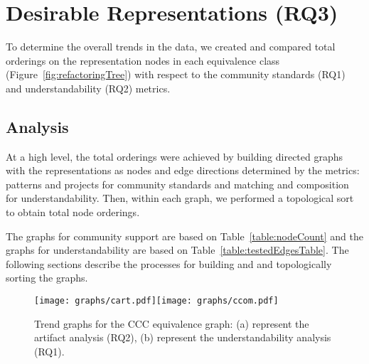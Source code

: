 

\section{Desirable Representations (RQ3)}
\label{sec:rq3}
To determine the overall trends in the data, we created and compared total orderings on the representation nodes in each equivalence class (Figure~\ref{fig:refactoringTree})  with respect to the community standards (RQ1)  and understandability (RQ2) metrics.

\subsection{Analysis}
At a high level, the total orderings were achieved by building directed graphs with the representations as nodes and edge directions determined by the metrics: patterns and projects for community standards and matching and composition for understandability. Then, within each graph, we performed a topological sort to obtain total node orderings.

The graphs for community support are based on Table~\ref{table:nodeCount} and the graphs for understandability are based on Table~\ref{table:testedEdgesTable}. The following sections describe the processes for building and and topologically sorting the graphs. 

\begin{figure}[tb]
\centering
\texttt{[image: graphs/cart.pdf]}\texttt{[image: graphs/ccom.pdf]}
\vspace{-12pt}
\caption{Trend graphs for the CCC equivalence graph: (a) represent the artifact analysis (RQ2), (b) represent the understandability analysis (RQ1).}

\label{fig:graphsforanalysis}
\end{figure}



